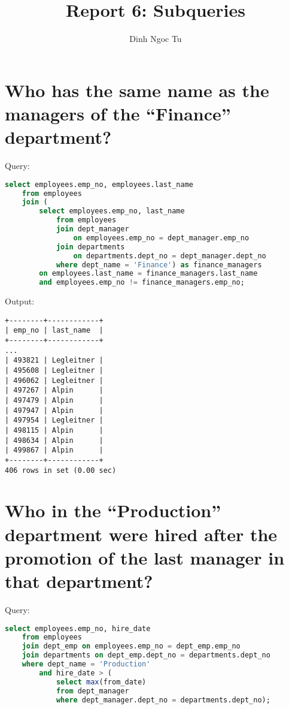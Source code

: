 \documentclass[12pt]{article}
\title{Report 6: Subqueries}
\author{Dinh Ngoc Tu}
\begin{document}
\maketitle


\section{Who has the same name as the managers of the ``Finance'' department?}

Query:

\begin{lstlisting}[language=SQL]
select employees.emp_no, employees.last_name
    from employees
    join (
        select employees.emp_no, last_name
            from employees
            join dept_manager
                on employees.emp_no = dept_manager.emp_no
            join departments
                on departments.dept_no = dept_manager.dept_no
            where dept_name = 'Finance') as finance_managers
        on employees.last_name = finance_managers.last_name
        and employees.emp_no != finance_managers.emp_no;
\end{lstlisting}

Output:

\begin{verbatim}
+--------+------------+
| emp_no | last_name  |
+--------+------------+
...
| 493821 | Legleitner |
| 495608 | Legleitner |
| 496062 | Legleitner |
| 497267 | Alpin      |
| 497479 | Alpin      |
| 497947 | Alpin      |
| 497954 | Legleitner |
| 498115 | Alpin      |
| 498634 | Alpin      |
| 499867 | Alpin      |
+--------+------------+
406 rows in set (0.00 sec)
\end{verbatim}


\section{Who in the ``Production'' department were hired after the promotion of the last manager in that department?}

Query:

\begin{lstlisting}[language=SQL]
select employees.emp_no, hire_date
    from employees
    join dept_emp on employees.emp_no = dept_emp.emp_no
    join departments on dept_emp.dept_no = departments.dept_no
    where dept_name = 'Production'
        and hire_date > (
            select max(from_date)
            from dept_manager
            where dept_manager.dept_no = departments.dept_no);
\end{lstlisting}
\end{document}
